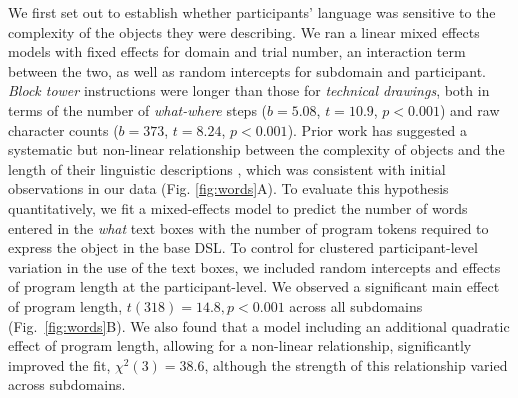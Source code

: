 \documentclass[10pt,letterpaper]{article}
\begin{document}
We first set out to establish whether participants' language was sensitive to the complexity of the objects they were describing.
We ran a linear mixed effects models with fixed effects for domain and trial number, an interaction term between the two, as well as random intercepts for subdomain and participant.
\textit{Block tower} instructions were longer than those for \textit{technical drawings}, both in terms of the number of \textit{what-where} steps  ($b=5.08$, $t=10.9$, $p<0.001$) and raw character counts ($b=373$, $t=8.24$, $p<0.001$). 
Prior work has suggested a systematic but non-linear relationship between the complexity of objects and the length of their linguistic descriptions \cite{sun2021seeing}, which was consistent with initial observations in our data (Fig. \ref{fig:words}A).
To evaluate this hypothesis quantitatively, we fit a mixed-effects model to predict the number of words entered in the \textit{what} text boxes with the number of program tokens required to express the object in the base DSL.
To control for clustered participant-level variation in the use of the text boxes, we included random intercepts and effects of program length at the participant-level.
We observed a significant main effect of program length, $t(318)=14.8, p < 0.001$ across all subdomains (Fig.~\ref{fig:words}B).
We also found that a model including an additional quadratic effect of program length, allowing for a non-linear relationship, significantly improved the fit, $\chi^2(3)=38.6$, although the strength of this relationship varied across subdomains.
\end{document}
